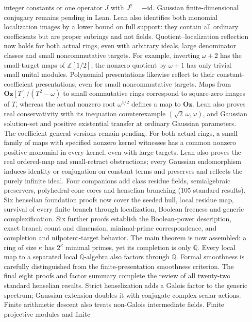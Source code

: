 \documentclass[11pt]{article}
\newcommand{\Q}{\mathbb{Q}}
\newcommand{\Oz}{\mathbf{Oz}}
\newcommand{\Z}{\mathbb{Z}}
\begin{document}
{integer constants or one operator $J$ with $J^2=-\mathrm{id}$.
Gaussian finite-dimensional conjugacy remains pending in Lean.
Lean also identifies both monomial localization images by a lower bound
on full support: they contain all ordinary coefficients but are proper
subrings and not fields. Quotient--localization reflection now holds for
both actual rings, even with arbitrary ideals, large denominator classes
and small noncommutative targets. For example, inverting $\omega+2$ has
the small-target maps of $\Z[1/2]$; the nonzero quotient by $\omega+1$
has only trivial small unital modules. Polynomial presentations likewise
reflect to their constant-coefficient presentations, even for small
noncommutative targets. Maps from $\Oz[T]/(T^2-\omega)$ to small
commutative rings correspond to square-zero images of $T$, whereas the
actual nonzero root $\omega^{1/2}$ defines a map to $\Oz$.
Lean also proves real conservativity with its inequation counterexample
$(\sqrt2\,\omega,\omega)$, and Gaussian solution-set and positive
existential transfer at ordinary Gaussian parameters.
The coefficient-general versions remain pending.
For both actual rings, a small family of maps with specified nonzero
kernel witnesses has a common nonzero positive monomial in every kernel,
even with large targets. Lean also proves the real ordered-map and
small-retract obstructions; every Gaussian endomorphism induces identity
or conjugation on constant terms and preserves and reflects the purely
infinite ideal.
Four companions add class residue fields, semialgebraic preservers,
polyhedral-cone cores and henselian branching (105 standard results).
Six henselian foundation proofs now cover the seeded hull, local residue
map, survival of every finite branch through localization, Boolean
freeness and generic complexification. Six further proofs establish the
Boolean-power description, exact branch count and dimension, minimal-prime
correspondence, and completion and nilpotent-target behavior. The main
theorem is now assembled: a ring of size $\kappa$ has $2^\kappa$ minimal
primes, yet its completion is only $\Q$. Every local map to a separated
local $\Q$-algebra also factors through $\Q$. Formal smoothness is
carefully distinguished from the finite-presentation smoothness criterion.
The final eight proofs and factor summary complete the review of all
twenty-two standard henselian results. Strict henselization adds a Galois
factor to the generic spectrum; Gaussian extension doubles it with
conjugate complex scalar actions. Finite arithmetic descent also treats
non-Galois intermediate fields. Finite projective modules and finite
}
\end{document}
